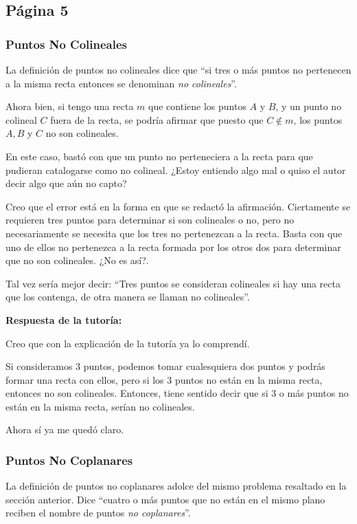 \subsection{Página 5}

\subsubsection{Puntos No Colineales}

La definición de puntos no colineales dice que ``si tres o más puntos no pertenecen a la misma recta entonces se denominan \textit{no colineales}''.

Ahora bien, si tengo una recta \(m\) que contiene los puntos \(A\) y \(B\), y un punto no colineal \(C\) fuera de la recta, se podría afirmar que puesto que \(C \notin m\), los puntos \(A,B\) y \(C\) no son colineales.

En este caso, bastó con que un punto  no perteneciera a la recta para que pudieran catalogarse como no colineal. ¿Estoy entiendo algo mal o quiso el autor decir algo que aún no capto?

Creo que el error está en la forma en que se redactó la afirmación. Ciertamente se requieren tres puntos para determinar si son colineales o no, pero no necesariamente se necesita que los tres no pertenezcan a la recta. Basta con que uno de ellos no pertenezca a la recta formada por los otros dos para determinar que no son colineales. ¿No es así?.

Tal vez sería mejor decir: ``Tres puntos se consideran colineales si hay una recta que los contenga, de otra manera se llaman no colineales''.

\textbf{Respuesta de la tutoría:}

Creo que con la explicación de la tutoría ya lo comprendí.

Si consideramos 3 puntos, podemos tomar cualesquiera dos puntos y podrás formar una recta con ellos, pero si los 3 puntos no están en la misma recta, entonces no son colineales. Entonces, tiene sentido decir que si 3 o más puntos no están en la misma recta, serían no colineales.

Ahora sí ya me quedó claro.

\subsubsection{Puntos No Coplanares}

La definición de puntos no coplanares adolce del mismo problema resaltado en la sección anterior. Dice ``cuatro o más puntos que no están en el mismo plano reciben el nombre de puntos \textit{no coplanares}''.

